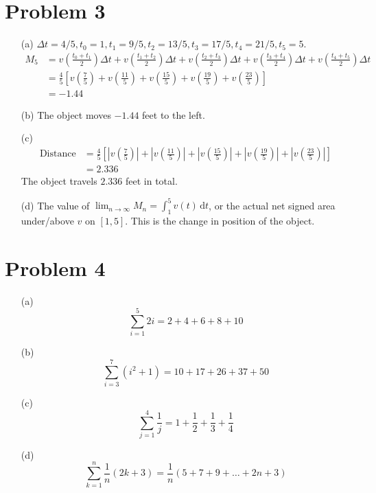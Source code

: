 \documentclass[preview, margin=0.6in]{standalone}
\newcommand*{\problem}[1]{\section*{Problem #1}}
\begin{document}
\problem{3}
\begin{itemize}
	\item[(a)]
		$\Delta t=4/5, t_0=1, t_1=9/5, t_2=13/5, t_3=17/5, t_4=21/5, t_5=5$.
		\begin{align*}
			M_5&=v\left(\frac{t_0+t_1}{2}\right)\Delta t
			   +v\left(\frac{t_1+t_2}{2}\right)\Delta t
			   +v\left(\frac{t_2+t_3}{2}\right)\Delta t
			   +v\left(\frac{t_3+t_4}{2}\right)\Delta t
			   +v\left(\frac{t_4+t_5}{2}\right)\Delta t \\ 
			   &=\frac45\left[v\left(\frac{7}{5}\right)  
			   +v\left(\frac{11}{5}\right)  
			   +v\left(\frac{15}{5}\right)  
			   +v\left(\frac{19}{5}\right)  
			   +v\left(\frac{23}{5}\right)\right] \\ 
			   &=-1.44
		\end{align*}

	\item[(b)] The object moves $-1.44$ feet to the left.

	\item[(c)]
		\begin{align*}
			\text{Distance}&=\frac45\left[\left|v\left(\frac{7}{5}\right)\right|
			   +\left|v\left(\frac{11}{5}\right)\right|
			   +\left|v\left(\frac{15}{5}\right)\right|
			   +\left|v\left(\frac{19}{5}\right)\right|
			   +\left|v\left(\frac{23}{5}\right)\right|\right] \\ 
			   &=2.336
		\end{align*}
		The object travels $2.336$ feet in total.

	\item[(d)]
		The value of $\lim_{n\to\infty}M_n=\int_{1}^{5}v(t)\,\mathrm{d}t$, or the actual net signed area under/above $v$ on $[1,5]$. This is the change in position of the object.
\end{itemize}

\problem{4}
\begin{itemize}
	\item[(a)]
		\begin{equation*}
		    \sum_{i=1}^{5}2i=2+4+6+8+10
		\end{equation*}
	\item[(b)]
		\begin{equation*}
		    \sum_{i=3}^{7}\left(i^2+1\right)=10+17+26+37+50
		\end{equation*}
	\item[(c)]
		\begin{equation*}
		    \sum_{j=1}^{4}\frac1j=1+\frac12+\frac13+\frac14
		\end{equation*}
	\item[(d)]
		\begin{equation*}
		    \sum_{k=1}^{n}\frac1n(2k+3)=\frac1n\left(5+7+9+\ldots+2n+3\right)
		\end{equation*}
\end{itemize}
\end{document}
